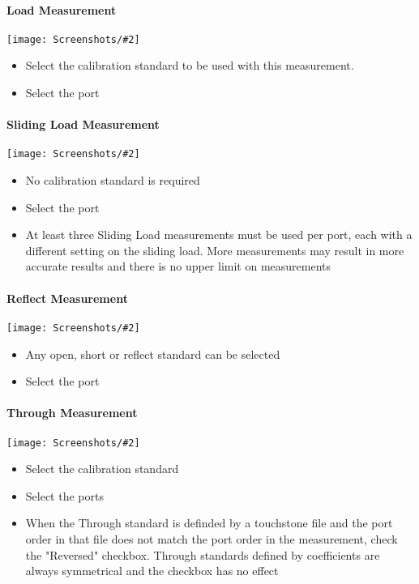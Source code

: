 \documentclass[a4paper,11pt]{article}
\newcommand{\screenshot}[2]{\begin{center}
\texttt{[image: Screenshots/\#2]}
\end{center}}
\begin{document}
\paragraph{Load Measurement}
\screenshot{1.0}{LoadMeasurement.png}
\begin{itemize}
\item Select the calibration standard to be used with this measurement.
\item Select the port
\end{itemize}

\paragraph{Sliding Load Measurement}
\screenshot{1.0}{SlidingLoadMeasurement.png}
\begin{itemize}
\item No calibration standard is required
\item Select the port
\item At least three Sliding Load measurements must be used per port, each with a different setting on the sliding load. More measurements may result in more accurate results and there is no upper limit on measurements
\end{itemize}

\paragraph{Reflect Measurement}
\screenshot{1.0}{ReflectMeasurement.png}
\begin{itemize}
\item Any open, short or reflect standard can be selected
\item Select the port
\end{itemize}

\paragraph{Through Measurement}
\screenshot{1.0}{ThroughMeasurement.png}
\begin{itemize}
\item Select the calibration standard
\item Select the ports
\item When the Through standard is definded by a touchstone file and the port order in that file does not match the port order in the measurement, check the "Reversed" checkbox. Through standards defined by coefficients are always symmetrical and the checkbox has no effect
\end{itemize}
\end{document}
